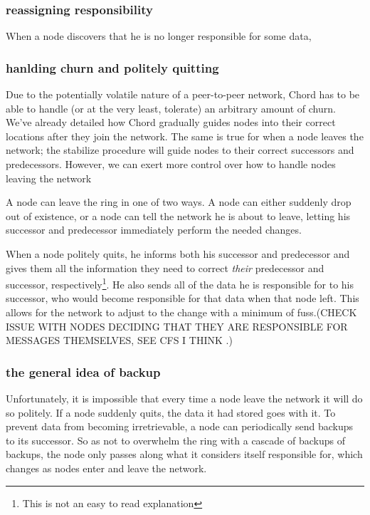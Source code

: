 \documentclass[conference, compsocconf, letterpaper]{IEEEtran}
\begin{document}
\subsubsection{reassigning responsibility}
When a node discovers that he is no longer responsible for some data,

\subsubsection{hanlding churn and politely quitting}
Due to the potentially volatile nature of a peer-to-peer network, Chord has to be able to handle (or at the very least, tolerate) an arbitrary amount of churn.  We've already detailed how Chord gradually guides nodes into their correct locations after they join the network.  The same is true for when a node leaves the network; the stabilize procedure will guide nodes to their correct successors and predecessors.  However, we can exert more control over how to handle nodes leaving the network

A node can leave the ring in one of two ways.  A node can either suddenly drop out of existence, or a node can tell the network he is about to leave, letting his successor and predecessor immediately perform the needed changes.

When a node politely quits, he informs both his successor and predecessor and gives them all the information they need to correct \emph{their} predecessor and successor, respectively\footnote{This is not an easy to read explanation}. He also sends all of the data he is responsible for to his successor, who would become responsible for that data when that node left.  This allows for the network to adjust to the change with a minimum of fuss.(CHECK ISSUE WITH NODES DECIDING THAT THEY ARE RESPONSIBLE FOR MESSAGES THEMSELVES, SEE CFS I THINK .) 

\subsubsection{the general idea of backup}
Unfortunately, it is impossible that every time a node leave the network it will do so politely.  If a node suddenly quits, the data it had stored goes with it. To prevent data from becoming irretrievable, a node can periodically send backups to its successor.  So as not to overwhelm the ring with a cascade of backups of backups, the node only passes along what it considers itself responsible for, which changes as nodes enter and leave the network.
\end{document}
